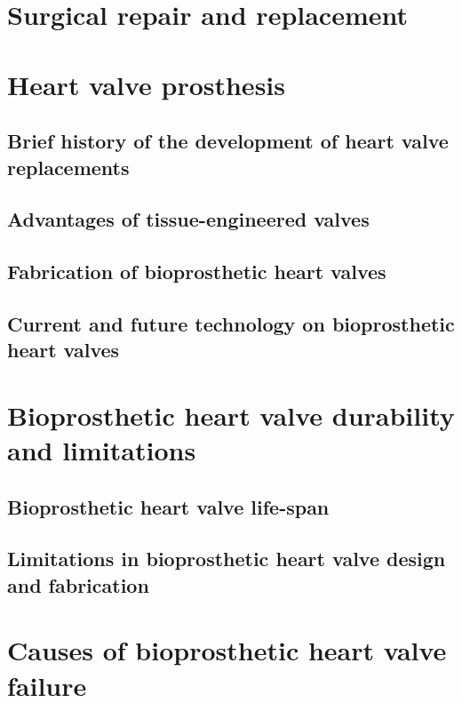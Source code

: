 \section{Surgical repair and replacement}


\section{Heart valve prosthesis}

\subsection{Brief history of the development of heart valve replacements}

\subsection{Advantages of tissue-engineered valves}

\subsection{Fabrication of bioprosthetic heart valves}

\subsection{Current and future technology on bioprosthetic heart valves}




\section{Bioprosthetic heart valve durability and limitations}

\subsection{Bioprosthetic heart valve life-span}

\subsection{Limitations in bioprosthetic heart valve design and fabrication}


\section{Causes of bioprosthetic heart valve failure}


